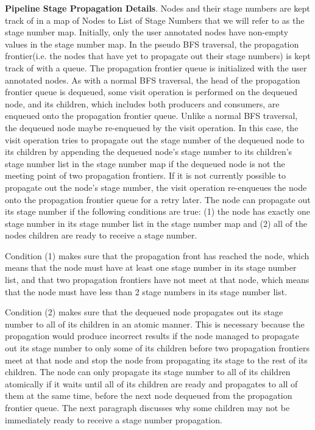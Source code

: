 {\bf Pipeline Stage Propagation Details}. Nodes and their stage
numbers are kept track of in a map of Nodes to List of Stage Numbers
that we will refer to as the stage number map. Initially, only the
user annotated nodes have non-empty values in the stage number map. In
the pseudo BFS traversal, the propagation frontier(i.e. the nodes that
have yet to propagate out their stage numbers) is kept track of with a
queue. The propagation frontier queue is initialized with the user
annotated nodes. As with a normal BFS traversal, the head of the
propagation frontier queue is dequeued, some visit operation is
performed on the dequeued node, and its children, which includes both
producers and consumers, are enqueued onto the propagation frontier
queue. Unlike a normal BFS traversal, the dequeued node maybe
re-enqueued by the visit operation. In this case, the visit operation
tries to propagate out the stage number of the dequeued node to its
children by appending the dequeued node's stage number to its
children's stage number list in the stage number map if the dequeued
node is not the meeting point of two propagation frontiers. If it is
not currently possible to propagate out the node's stage number, the
visit operation re-enqueues the node onto the propagation frontier
queue for a retry later. The node can propagate out its stage number
if the following conditions are true: (1) the node has exactly one
stage number in its stage number list in the stage number map and (2)
all of the nodes children are ready to receive a stage number.  

Condition (1) makes sure that the propagation front has reached the
node, which means that the node must have at least one stage number in
its stage number list, and that two propagation frontiers have not
meet at that node, which means that the node must have less than 2
stage numbers in its stage number list.  

Condition (2) makes sure that the dequeued node propagates out its
stage number to all of its children in an atomic manner. This is
necessary because the propagation would produce incorrect results if
the node managed to propagate out its stage number to only some of its
children before two propagation frontiers meet at that node and stop
the node from propagating its stage to the rest of its children. The
node can only propagate its stage number to all of its children
atomically if it waits until all of its children are ready and
propagates to all of them at the same time, before the next node
dequeued from the propagation frontier queue. The next paragraph
discusses why some children may not be immediately ready to receive a
stage number propagation. 


